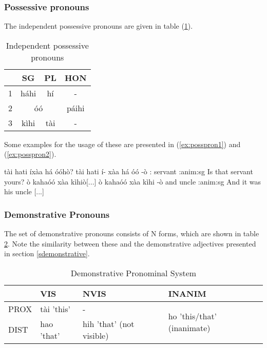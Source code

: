 \documentclass[a4paper, 12pt, oneside]{memoir}
\begin{document}
\subsubsection{Possessive pronouns}
The independent possessive pronouns are given in table (\ref{t:posspron}).
\begin{table}[H]
\begin{centering}
\begin{tabular}{@{}lccc@{}}
\toprule
\multicolumn{1}{c}{} & SG         & PL        & HON   \\ \midrule
1                    & háhi       & hí        & -     \\
2                    & \multicolumn{2}{c}{óó} & páihi \\
3                    & kìhi       & tài       & -     \\ \bottomrule
\end{tabular}
\caption{Independent possessive pronouns}
\label{t:posspron}
\end{centering}
\end{table}
Some examples for the usage of these are presented in (\ref{ex:posspron1}) and (\ref{ex:posspron2}).
\begin{examples}
\ex \label{ex:posspron1}
\words tài hati íxàa há óóhò?
\bits tài hati í- xàa há óó -ò
\gloss {\Dem}:{\Prox} servant {\Intrg} {\Cop} {\Cngr} {\Ssposs} {\Cl}:anim:sg
\tr Is that servant yours?
\ex \label{ex:posspron2}
\words ò kahaóó xàa kìhiò[...]
\bits ò kahaóó xàa kìhi -ò
\gloss and uncle {\Cop} {\Tsposs} {\Cl}:anim:sg
\tr And it was his uncle [...]
\end{examples}
\subsubsection{Demonstrative Pronouns}
The set of demonstrative pronouns consists of N forms, which are shown in table \ref{t:dempron}. Note the similarity between these and the demonstrative adjectives presented in section \ref{sdemonstrative}.

\begin{table}[H]
\centering
\begin{tabular}{@{}llll@{}}
\toprule
     & VIS        & NVIS                     & INANIM                                      \\ \midrule
PROX & tài 'this' & -                        & \multirow{2}{*}{ho 'this/that' (inanimate)} \\
DIST & hao 'that' & hih 'that' (not visible) &                                           \\ \bottomrule
\end{tabular}
\caption{Demonstrative Pronominal System}
\label{t:dempron}
\end{table}
\end{document}
